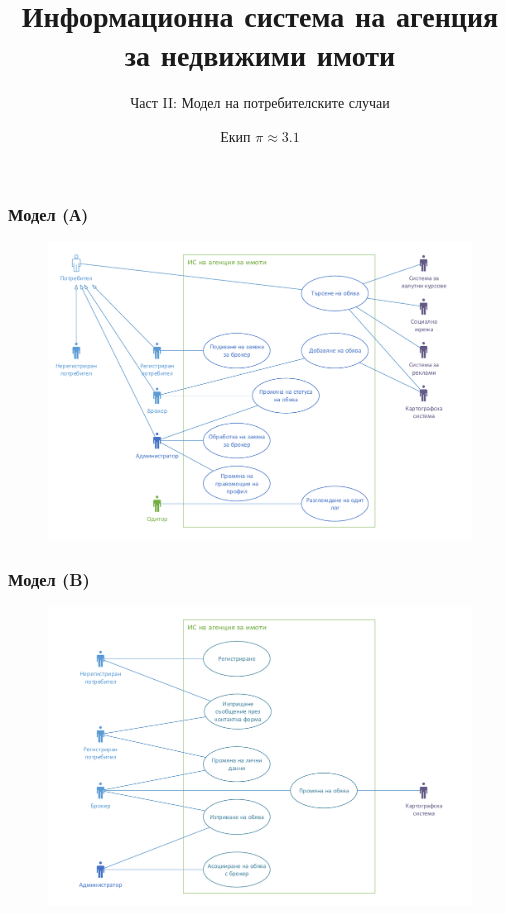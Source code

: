 \documentclass[12pt]{beamer}
\title{Информационна система на агенция за недвижими имоти}
\subtitle{Част II: Модел на потребителските случаи}
\author{Екип $\pi \approx 3.1$}
\date{}
\begin{document}
\begin{frame}
\titlepage
\end{frame}


\begin{frame}[fragile]
\frametitle{Модел (А)}
        \begin{figure}[h]
        \centering
        \includegraphics[scale=0.5]{uc1-a}
        \end{figure}
\end{frame}

\begin{frame}[fragile]
\frametitle{Модел (B)}
        \begin{figure}[h]
        \centering
        \includegraphics[scale=0.5]{uc1-b}
        \end{figure}
\end{frame}
\end{document}
